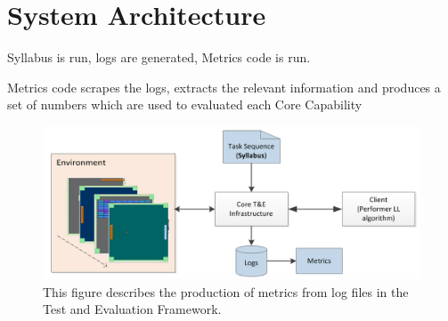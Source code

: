 \chapter{System Architecture}\label{ch:system_architechture}

Syllabus is run, logs are generated, Metrics code is run.



Metrics code scrapes the logs, extracts the relevant information and produces a set of numbers which are used to evaluated each Core Capability





\begin{figure}[h]
	\centering
	\includegraphics[width=0.85\columnwidth]{figs/metrics_diagram.png}
	\caption{This figure describes the production of metrics from log files in the Test and Evaluation Framework.}
	\label{fig:system_layout}
\end{figure}
